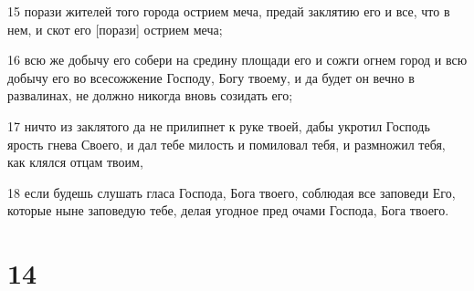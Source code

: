 \par 15 порази жителей того города острием меча, предай заклятию его и все, что в нем, и скот его [порази] острием меча;
\par 16 всю же добычу его собери на средину площади его и сожги огнем город и всю добычу его во всесожжение Господу, Богу твоему, и да будет он вечно в развалинах, не должно никогда вновь созидать его;
\par 17 ничто из заклятого да не прилипнет к руке твоей, дабы укротил Господь ярость гнева Своего, и дал тебе милость и помиловал тебя, и размножил тебя, как клялся отцам твоим,
\par 18 если будешь слушать гласа Господа, Бога твоего, соблюдая все заповеди Его, которые ныне заповедую тебе, делая угодное пред очами Господа, Бога твоего.

\chapter{14}

